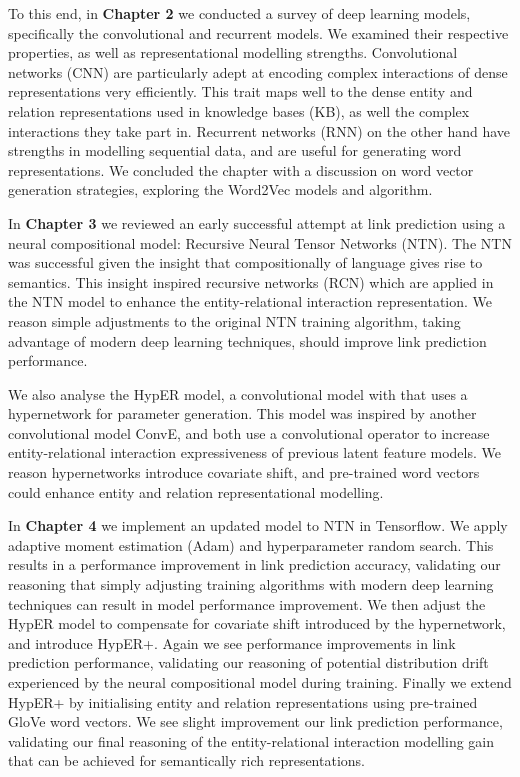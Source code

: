 \noindent To this end, in \textbf{Chapter 2} we conducted a survey of deep learning models, specifically the convolutional and recurrent models. We examined their respective properties, as well as representational modelling strengths. Convolutional networks (CNN) are particularly adept at encoding complex interactions of dense representations very efficiently. This trait maps well to the dense entity and relation representations used in knowledge bases (KB), as well the complex interactions they take part in. Recurrent networks (RNN) on the other hand have strengths in modelling sequential data, and are useful for generating word representations. We concluded the chapter with a discussion on word vector generation strategies, exploring the Word2Vec models and algorithm. \par

\noindent In \textbf{Chapter 3} we reviewed an early successful attempt at link prediction using a neural compositional model: Recursive Neural Tensor Networks (NTN). The NTN was successful given the insight that compositionally of language gives rise to semantics. This insight inspired recursive networks (RCN) which are applied in the NTN model to enhance the entity-relational interaction representation. We reason simple adjustments to the original NTN training algorithm, taking advantage of modern deep learning techniques, should improve link prediction performance. \newpage 

\noindent We also analyse the HypER model, a convolutional model with that uses a hypernetwork for parameter generation. This model was inspired by another convolutional model ConvE, and both use a convolutional operator to increase entity-relational interaction expressiveness of previous latent feature models. We reason hypernetworks introduce covariate shift, and pre-trained word vectors could enhance entity and relation representational modelling. \par

\noindent In \textbf{Chapter 4} we implement an updated model to NTN in Tensorflow. We apply adaptive moment estimation (Adam) and hyperparameter random search. This results in a performance improvement in link prediction accuracy, validating our reasoning that simply adjusting training algorithms with modern deep learning techniques can result in model performance improvement. We then adjust the HypER model to compensate for covariate shift introduced by the hypernetwork, and introduce HypER+. Again we see performance improvements in link prediction performance, validating our reasoning of potential distribution drift experienced by the neural compositional model during training. Finally we extend HypER+ by initialising entity and relation representations using pre-trained GloVe word vectors. We see slight improvement our link prediction performance, validating our final reasoning of the entity-relational interaction modelling gain that can be achieved for semantically rich representations. \par

